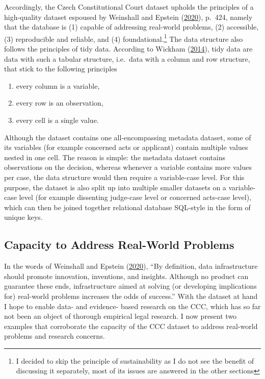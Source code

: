 \documentclass[
  11pt,
]{article}
\providecommand{\tightlist}{%
  \setlength{\itemsep}{0pt}\setlength{\parskip}{0pt}}
\begin{document}
Accordingly, the Czech Constitutional Court dataset upholds the
principles of a high-quality dataset espoused by Weinshall and Epstein
(\protect\hyperlink{ref-weinshallDevelopingHighQualityData2020}{2020}),
p.~424, namely that the database is (1) capable of addressing real-world
problems, (2) accessible, (3) reproducible and reliable, and (4)
foundational.\footnote{I decided to skip the principle of sustainability
  as I do not see the benefit of discussing it separately, most of its
  issues are answered in the other sections} The data structure also
follows the principles of tidy data. According to Wickham
(\protect\hyperlink{ref-wickhamTidyData2014}{2014}), tidy data are data
with such a tabular structure, i.e.~data with a column and row
structure, that stick to the following principles

\begin{enumerate}
\def\labelenumi{(\arabic{enumi})}
\tightlist
\item
  every column is a variable,
\item
  every row is an observation,
\item
  every cell is a single value.
\end{enumerate}

Although the dataset contains one all-encompassing metadata dataset,
some of its variables (for example concerned acts or applicant) contain
multiple values nested in one cell. The reason is simple: the metadata
dataset contains observations on the decision, whereas whenever a
variable contains more values per case, the data structure would then
require a variable-case level. For this purpose, the dataset is also
split up into multiple smaller datasets on a variable-case level (for
example dissenting judge-case level or concerned acts-case level), which
can then be joined together relational database SQL-style in the form of
unique keys.

\hypertarget{capacity-to-address-real-world-problems}{%
\subsection{Capacity to Address Real-World
Problems}\label{capacity-to-address-real-world-problems}}

In the words of Weinshall and Epstein
(\protect\hyperlink{ref-weinshallDevelopingHighQualityData2020}{2020}),
``By definition, data infrastructure should promote innovation,
inventions, and insights. Although no product can guarantee these ends,
infrastructure aimed at solving (or developing implications for)
real-world problems increases the odds of success.'' With the dataset at
hand I hope to enable data- and evidence- based research on the CCC,
which has so far not been an object of thorough empirical legal
research. I now present two examples that corroborate the capacity of
the CCC dataset to address real-world problems and research concerns.
\end{document}
